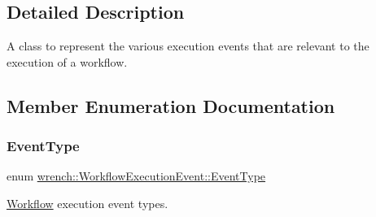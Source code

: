 \subsection{Detailed Description}
A class to represent the various execution events that are relevant to the execution of a workflow. 

\subsection{Member Enumeration Documentation}
\mbox{\label{classwrench_1_1_workflow_execution_event_a5611165191fbc4d121d1b141c748a448}} 
\subsubsection{\texorpdfstring{Event\+Type}{EventType}}
{\footnotesize\ttfamily enum \hyperlink{classwrench_1_1_workflow_execution_event_a5611165191fbc4d121d1b141c748a448}{wrench\+::\+Workflow\+Execution\+Event\+::\+Event\+Type}}



\hyperlink{classwrench_1_1_workflow}{Workflow} execution event types. 

